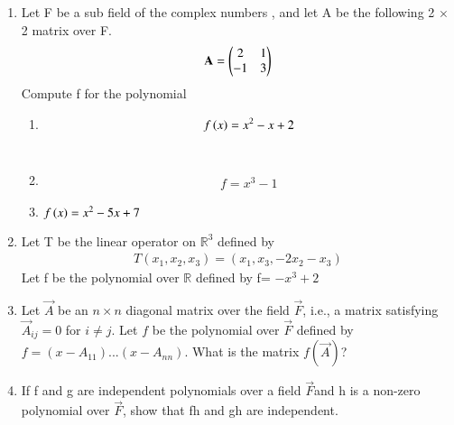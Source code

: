 \renewcommand{\theequation}{\theenumi}
\renewcommand{\thefigure}{\theenumi}
\begin{enumerate}[label=\thesubsection.\arabic*.,ref=\thesubsection.\theenumi]

\item Let F be a sub field of the complex numbers , and let A be the following 2 $\times$ 2 matrix over F.
\begin{align}
  \mathbf{A}=\begin{pmatrix}2&1\\-1&3\end{pmatrix}  
\end{align}
Compute f for the polynomial
\begin{enumerate}
\item 
\begin{align}
    f\left(x\right)=x^{2}-x+2
\end{align}
%
\\
\solution

\item
\begin{align}
f = x^3 - 1
\end{align}
\solution

%
\item 
$f\left(x\right)=x^{2}-5x+7$
%
\\
\solution

\end{enumerate}
\item Let T be the linear operator on $\mathbb{R}^3$ defined by
\begin{align}
T(x_1,x_2,x_3)=(x_1,x_3,-2x_2-x_3)
\end{align}
Let f be the polynomial over $\mathbb{R}$ defined by f= $-x^3+2$
%
\\
\solution

\item Let $\vec{A}$ be an $n \times n$ diagonal matrix over the field $\vec{F}$, i.e., a matrix satisfying $\vec{A}_{ij} = 0$ for $i \neq j$. Let $f$ be the polynomial over $\vec{F}$ defined by $f = (x - A_{11}) . . . (x - A_{nn})$. What is the matrix $f(\vec{A})$? 
%
\\
\solution

\item If f  and g are independent polynomials over a field $\vec{F}$and h is a non-zero
polynomial over $\vec{F}$, show that fh and gh are independent.
%
\\
\solution

\end{enumerate}
